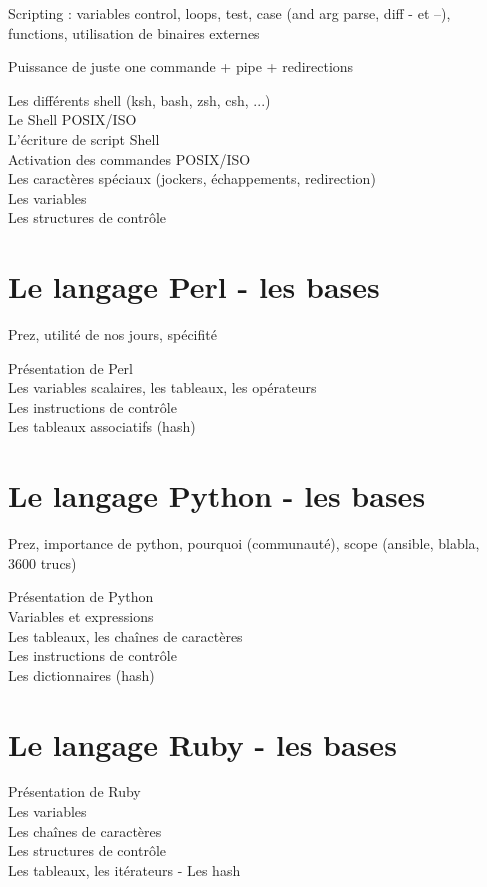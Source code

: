 \documentclass[11pt,a4paper]{article}
\begin{document}
Scripting : variables control, loops, test, case (and arg parse, diff - et --), functions, utilisation de binaires externes

Puissance de juste one commande + pipe + redirections

Les différents shell (ksh, bash, zsh, csh, ...)\\
Le Shell POSIX/ISO\\
L'écriture de script Shell \\
Activation des commandes POSIX/ISO\\
Les caractères spéciaux (jockers, échappements, redirection)\\
Les variables\\
Les structures de contrôle\\

\section{Le langage Perl - les bases}
Prez, utilité de nos jours, spécifité

Présentation de Perl\\
Les variables scalaires, les tableaux, les opérateurs\\
Les instructions de contrôle\\
Les tableaux associatifs (hash)\\

\section{Le langage Python - les bases}
Prez, importance de python, pourquoi (communauté), scope (ansible, blabla, 3600 trucs)

Présentation de Python\\
Variables et expressions\\
Les tableaux, les chaînes de caractères\\
Les instructions de contrôle\\
Les dictionnaires (hash)\\

\section{Le langage Ruby - les bases}
Présentation de Ruby\\
Les variables\\
Les chaînes de caractères\\
Les structures de contrôle\\
Les tableaux, les itérateurs - Les hash\\
\end{document}
